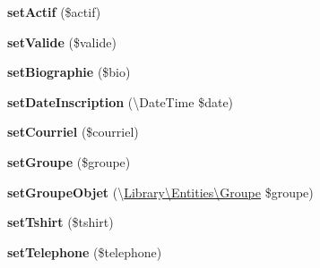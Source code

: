 \begin{DoxyCompactItemize}
\item 
\hypertarget{class_library_1_1_entities_1_1_membre_ab36a76123c8f30b50797ab3d14c85d8f}{{\bfseries set\+Actif} (\$actif)}\label{class_library_1_1_entities_1_1_membre_ab36a76123c8f30b50797ab3d14c85d8f}

\item 
\hypertarget{class_library_1_1_entities_1_1_membre_a6c5a4ec12366c71498f3dd655f3bb128}{{\bfseries set\+Valide} (\$valide)}\label{class_library_1_1_entities_1_1_membre_a6c5a4ec12366c71498f3dd655f3bb128}

\item 
\hypertarget{class_library_1_1_entities_1_1_membre_ae67dfd0155b3c66470ac8d5a9617f3a4}{{\bfseries set\+Biographie} (\$bio)}\label{class_library_1_1_entities_1_1_membre_ae67dfd0155b3c66470ac8d5a9617f3a4}

\item 
\hypertarget{class_library_1_1_entities_1_1_membre_a57056186fbc70e210b4397ff5b874cd9}{{\bfseries set\+Date\+Inscription} (\textbackslash{}Date\+Time \$date)}\label{class_library_1_1_entities_1_1_membre_a57056186fbc70e210b4397ff5b874cd9}

\item 
\hypertarget{class_library_1_1_entities_1_1_membre_a35934dd656945b344fd504340f869729}{{\bfseries set\+Courriel} (\$courriel)}\label{class_library_1_1_entities_1_1_membre_a35934dd656945b344fd504340f869729}

\item 
\hypertarget{class_library_1_1_entities_1_1_membre_a812972907479123782061d0b79dcc827}{{\bfseries set\+Groupe} (\$groupe)}\label{class_library_1_1_entities_1_1_membre_a812972907479123782061d0b79dcc827}

\item 
\hypertarget{class_library_1_1_entities_1_1_membre_a3d50a14d2af5c294a7954f042f708d21}{{\bfseries set\+Groupe\+Objet} (\textbackslash{}\hyperlink{class_library_1_1_entities_1_1_groupe}{Library\textbackslash{}\+Entities\textbackslash{}\+Groupe} \$groupe)}\label{class_library_1_1_entities_1_1_membre_a3d50a14d2af5c294a7954f042f708d21}

\item 
\hypertarget{class_library_1_1_entities_1_1_membre_a7da54710d7751a97ebb186afc741c4ec}{{\bfseries set\+Tshirt} (\$tshirt)}\label{class_library_1_1_entities_1_1_membre_a7da54710d7751a97ebb186afc741c4ec}

\item 
\hypertarget{class_library_1_1_entities_1_1_membre_a9320befcdd01e8c5d3c780788870998e}{{\bfseries set\+Telephone} (\$telephone)}\label{class_library_1_1_entities_1_1_membre_a9320befcdd01e8c5d3c780788870998e}


\end{DoxyCompactItemize}

